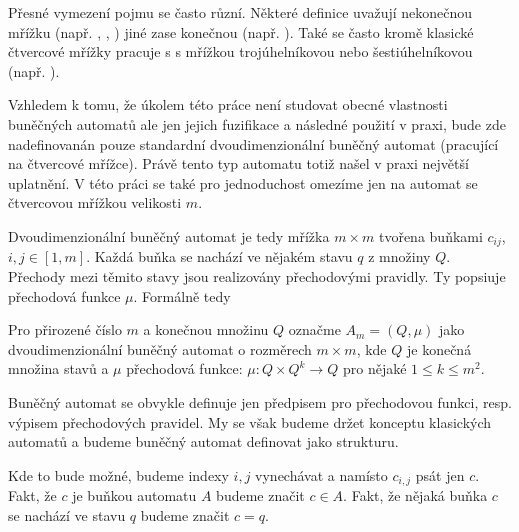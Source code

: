 \documentclass[a4paper,10pt]{article}
\begin{document}
Přesné vymezení pojmu  se často různí. Některé definice uvažují nekonečnou mřížku (např. \cite{Wol-NewKiSci}, \cite{Wol-CelAut}, \cite{BatXie-CellCity})
jiné zase konečnou (např. \cite{Wu-ExpGenPolUrbGroCelAutCit}). Také se často kromě klasické čtvercové mřížky pracuje s s mřížkou trojúhelníkovou nebo šestiúhelníkovou (např. \cite{For-FuzCelAutConjNormForm}).

Vzhledem k tomu, že úkolem této práce není studovat obecné vlastnosti buněčných automatů ale jen jejich fuzifikace a následné použití v praxi, bude zde nadefinovanán pouze standardní dvoudimenzionální buněčný automat (pracující na čtvercové mřížce). Právě tento typ automatu totiž našel v praxi největší uplatnění. V této práci se také pro jednoduchost omezíme jen na automat se čtvercovou mřížkou velikosti $m$.

Dvoudimenzionální buněčný automat je tedy mřížka $m \times m$ tvořena buňkami $c_{ij}$, $i, j \in [1,m]$. Každá buňka se nachází ve nějakém stavu $q$ z množiny $Q$. Přechody mezi těmito stavy jsou realizovány přechodovými pravidly. Ty popsiuje přechodová funkce $\mu$. Formálně tedy

\begin{definition}
  Pro přirozené číslo $m$ a konečnou množinu $Q$ označme $A_{m} = (Q, \mu)$ jako dvoudimenzionální buněčný automat o rozměrech $m \times m$, kde $Q$ je konečná množina stavů a $\mu$ přechodová funkce: $\mu: Q \times Q^k \rightarrow Q$ pro nějaké $1 \leq k \leq m^2$.
\end{definition}

\begin{note}
  Buněčný automat se obvykle definuje jen předpisem pro přechodovou funkci, resp. výpisem přechodových pravidel. My se však budeme držet konceptu klasických automatů a budeme buněčný automat definovat jako strukturu.
\end{note}
\begin{notation*}
  Kde to bude možné, budeme indexy $i,j$ vynechávat a namísto $c_{i,j}$ psát jen $c$. Fakt, že $c$ je buňkou automatu $A$ budeme značit $c \in A$. Fakt, že nějaká buňka $c$ se nachází ve stavu $q$ budeme značit $c = q$. 
\end{notation*}
\end{document}
